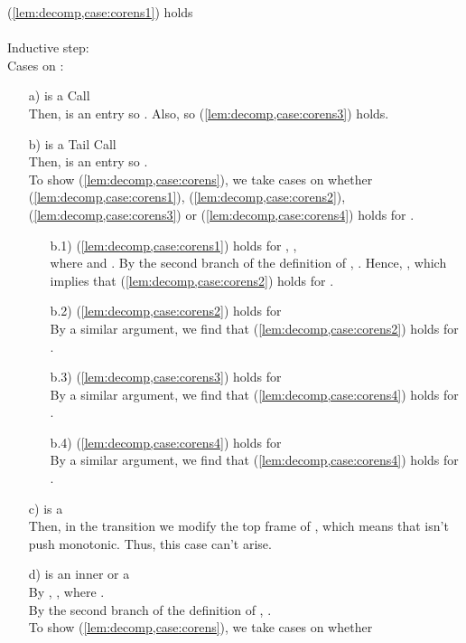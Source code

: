 \documentclass{LMCS}
\theoremstyle{definition} \newtheorem{property}[thm]{Property}
\begin{document}
 (\ref{lem:decomp,case:corens1}) holds \\
\\
Inductive step:  \\
Cases on :
\begin{enumerate}[]
\item[a)]
   is a Call \\
  Then, \astat{} is an entry so . 
  Also, 
  so (\ref{lem:decomp,case:corens3}) holds.
\item[b)]
   is a Tail Call \\
  Then, \astat{} is an entry so . \\
  To show (\ref{lem:decomp,case:corens}), we take cases on whether 
  (\ref{lem:decomp,case:corens1}), (\ref{lem:decomp,case:corens2}),
  (\ref{lem:decomp,case:corens3}) or (\ref{lem:decomp,case:corens4})
  holds for .
  \begin{enumerate}[b.1]
  \item[b.1)]
    (\ref{lem:decomp,case:corens1}) holds for , \ie, \\
     where
     and .
    By the second branch of the definition of \dcorens{},
    .
    Hence, ,
    which implies that (\ref{lem:decomp,case:corens2}) holds for \astat.
  \item[b.2)]
    (\ref{lem:decomp,case:corens2}) holds for  \\
    By a similar argument, 
    we find that (\ref{lem:decomp,case:corens2}) holds for \astat.
  \item[b.3)]
    (\ref{lem:decomp,case:corens3}) holds for  \\
    By a similar argument, 
    we find that (\ref{lem:decomp,case:corens4}) holds for \astat.
  \item[b.4)]
    (\ref{lem:decomp,case:corens4}) holds for  \\
    By a similar argument, 
    we find that (\ref{lem:decomp,case:corens4}) holds for \astat.
  \end{enumerate}
\item[c)]
   is a  \\
  Then, in the transition  
  we modify the top frame of , 
  which means that  isn't push monotonic.
  Thus, this case can't arise.
\item[d)]
   is an inner \daceval{}
  or a  \\
  By \ih{},
  ,
  where . \\
  By the second branch of the definition of \dcoren{}, 
  .\\
  To show (\ref{lem:decomp,case:corens}), we take cases on whether 

\end{enumerate}
\end{document}
